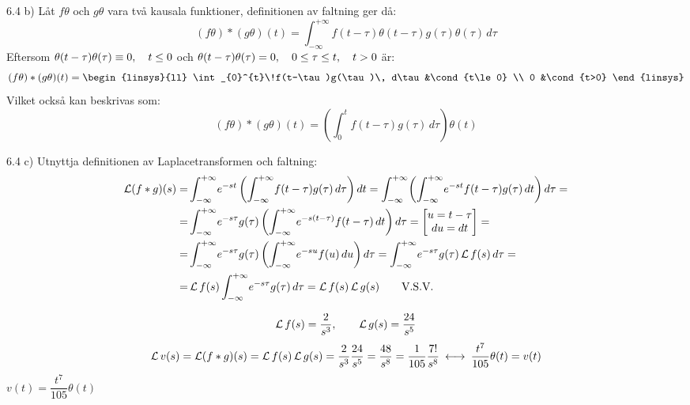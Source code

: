 \begin{task}{6.4 b)}
	Låt $f\theta$ och $g\theta$ vara två kausala funktioner, definitionen av faltning ger då:
	\[(f\theta)*(g\theta)(t)=
	\int_{-\infty}^{+\infty}\!f(t-\tau)\theta(t-\tau)g(\tau)\theta(\tau)\, d\tau\]
	Eftersom $\theta(t-\tau)\theta(\tau)\equiv0, \quad t\le 0$ och $\theta(t-\tau)\theta(\tau)=0, \quad 0\le\tau\le t, \quad t > 0$ är:
	\[(f\theta)*(g\theta)(t)=\begin{linsys}{ll}
	\int_{0}^{t}\!f(t-\tau)g(\tau)\, d\tau&\cond{t\le0} \\
	0                                     &\cond{t>0}
	\end{linsys}\]
	Vilket också kan beskrivas som:
	\[(f\theta)*(g\theta)(t)=
	\left(\int_{0}^{t}\!f(t-\tau)g(\tau)\, d\tau\right)\theta(t)\]
\end{task}

\begin{task}{6.4 c)}
	Utnyttja definitionen av Laplacetransformen och faltning:
	\begin{align*}
	\laplace(f*g)(s)=
	&\int_{-\infty}^{+\infty}\!e^{-st}\left(\int_{-\infty}^{+\infty}\!f(t-\tau)g(\tau)\,d\tau\right)dt=
	\int_{-\infty}^{+\infty}\!\left(\int_{-\infty}^{+\infty}\!e^{-st}f(t-\tau)g(\tau)\,dt\right)d\tau= \\ =
	&\int_{-\infty}^{+\infty}\!e^{-s\tau}g(\tau)\left(\int_{-\infty}^{+\infty}\!e^{-s(t-\tau)}f(t-\tau)\,dt\right)d\tau=
	\begin{bmatrix}
	u=t-\tau \\
	du=dt
	\end{bmatrix}= \\ =
	&\int_{-\infty}^{+\infty}\!e^{-s\tau}g(\tau)\left(\int_{-\infty}^{+\infty}\!e^{-su}f(u)\,du\right)d\tau=
	\int_{-\infty}^{+\infty}\!e^{-s\tau}g(\tau)\laplace f(s)\, d\tau= \\ =
	&\laplace f(s)\int_{-\infty}^{+\infty}\!e^{-s\tau}g(\tau)\, d\tau=
	\laplace f(s)\*\laplace g(s)\mproof
	\end{align*}
\end{task}

\begin{task}{6.5}
	\[\operatorname{\mathcal{L}} f(s)=\frac{2}{s^3},\qquad
	\operatorname{\mathcal{L}} g(s)=\frac{24}{s^5}\]
	\begin{align*}
	\laplace v(s)=
	\laplace(f*g)(s)=
	\laplace f(s)\*\laplace g(s)=
	\frac{2}{s^3}\*\frac{24}{s^5}=
	\frac{48}{s^8}=\frac{1}{105}\*\frac{7!}{s^8}\llra
	\frac{t^{7}}{105}\theta(t)=
	v(t)
	\end{align*}
	\ans $v(t)=\dfrac{t^{7}}{105}\theta(t)$
\end{task}


